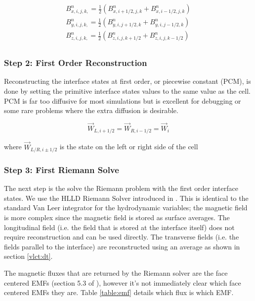 \begin{equation}
    \begin{aligned}
        B^n_{x,i,j,k,} = \frac{1}{2} \left( B^n_{x,i+1/2,j,k} + B^n_{x,i-1/2,j,k} \right) \\
        B^n_{y,i,j,k,} = \frac{1}{2} \left( B^n_{y,i,j+1/2,k} + B^n_{y,i,j-1/2,k} \right) \\
        B^n_{z,i,j,k,} = \frac{1}{2} \left( B^n_{z,i,j,k+1/2} + B^n_{z,i,j,k-1/2} \right) \\
    \end{aligned}
\end{equation}

\subsubsection{Step 2: First Order Reconstruction}
\label{vlct:first-order-reconstruction}

Reconstructing the interface states at first order, or piecewise constant (PCM), is done by setting the primitive interface states values to the same value as the cell. PCM is far too diffusive for most simulations but is excellent for debugging or some rare problems where the extra diffusion is desirable.

\begin{equation}
    \vec{W}_{L, i+1/2} = \vec{W}_{R, i-1/2} = \vec{W}_{i}
\end{equation}

where $ \vec{W}_{L/R, i\pm1/2} $ is the state on the left or right side of the cell

\subsubsection{Step 3: First Riemann Solve}
\label{vlct:first-riemann-solve}

The next step is the solve the Riemann problem with the first order interface states. We use the HLLD Riemann Solver introduced in \cite{hlld_2005}. This is identical to the standard Van Leer integrator for the hydrodynamic variables; the magnetic field is more complex since the magnetic field is stored as surface averages. The longitudinal field (i.e. the field that is stored at the interface itself) does not require reconstruction and can be used directly. The transverse fields (i.e. the fields parallel to the interface) are reconstructed using an average as shown in section \ref{vlct:dt}.

The magnetic fluxes that are returned by the Riemann solver are the face centered EMFs (section 5.3 of \cite{stone_athena_2008}), however it's not immediately clear which face centered EMFs they are. Table \ref{table:emf} details which flux is which EMF.

